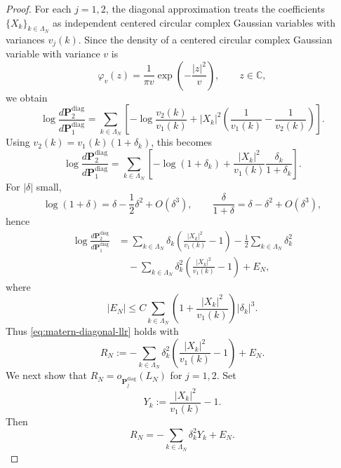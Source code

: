 \documentclass[11pt, reqno]{amsart}
\theoremstyle{remark}
\newcommand{\1}{\mathbf{1}}
\begin{document}
\begin{proof}
For each \(j=1,2\), the diagonal approximation treats the coefficients
\(\{X_k\}_{k\in\Lambda_N}\) as independent centered circular complex Gaussian
variables with variances \(v_j(k)\). Since the density of a centered circular
complex Gaussian variable with variance \(v\) is
\[
\varphi_v(z)=\frac1{\pi v}\exp\!\left(-\frac{|z|^2}{v}\right), \qquad z\in\mathbb C,
\]
we obtain
\[
\log\frac{d\mathbf P_2^{\mathrm{diag}}}{d\mathbf P_1^{\mathrm{diag}}}
=
\sum_{k\in\Lambda_N}
\left[
-\log\frac{v_2(k)}{v_1(k)}
+
|X_k|^2\left(\frac1{v_1(k)}-\frac1{v_2(k)}\right)
\right].
\]
Using \(v_2(k)=v_1(k)(1+\delta_k)\), this becomes
\[
\log\frac{d\mathbf P_2^{\mathrm{diag}}}{d\mathbf P_1^{\mathrm{diag}}}
=
\sum_{k\in\Lambda_N}
\left[
-\log(1+\delta_k)
+
\frac{|X_k|^2}{v_1(k)}\frac{\delta_k}{1+\delta_k}
\right].
\]
For \(|\delta|\) small,
\[
\log(1+\delta)=\delta-\frac12\delta^2+O(\delta^3),
\qquad
\frac{\delta}{1+\delta}=\delta-\delta^2+O(\delta^3),
\]
hence
\begin{align*}
\log\frac{d\mathbf P_2^{\mathrm{diag}}}{d\mathbf P_1^{\mathrm{diag}}}
&=
\sum_{k\in\Lambda_N}
\delta_k\left(\frac{|X_k|^2}{v_1(k)}-1\right)
-\frac12\sum_{k\in\Lambda_N}\delta_k^2 \\
&\quad
-\sum_{k\in\Lambda_N}\delta_k^2
\left(\frac{|X_k|^2}{v_1(k)}-1\right)
+
E_N,
\end{align*}
where
\[
|E_N|
\le
C\sum_{k\in\Lambda_N}
\left(1+\frac{|X_k|^2}{v_1(k)}\right)|\delta_k|^3.
\]
Thus \eqref{eq:matern-diagonal-llr} holds with
\[
R_N
:=
-\sum_{k\in\Lambda_N}\delta_k^2
\left(\frac{|X_k|^2}{v_1(k)}-1\right)
+
E_N.
\]
We next show that \(R_N=o_{\mathbf P_j^{\mathrm{diag}}}(L_N)\) for \(j=1,2\).
Set
\[
Y_k:=\frac{|X_k|^2}{v_1(k)}-1.
\]
Then
\[
R_N=-\sum_{k\in\Lambda_N}\delta_k^2Y_k+E_N.
\]


\end{proof}
\end{document}
